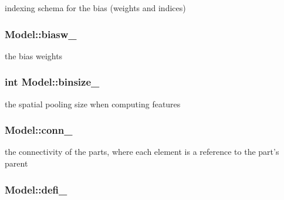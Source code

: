 indexing schema for the bias (weights and indices) 

\hypertarget{classModel_ab870c45d7637a43ba73c81cc4080a497}{
\subsubsection[{biasw\-\_\-}]{ Model\-::biasw\-\_\-\hspace{0.3cm}{\ttfamily [protected]}}}\label{classModel_ab870c45d7637a43ba73c81cc4080a497}


the bias weights 

\hypertarget{classModel_af34c4284d739cac02812d76eaa231679}{
\subsubsection[{binsize\-\_\-}]{\setlength{\rightskip}{0pt plus 5cm}int Model\-::binsize\-\_\-\hspace{0.3cm}{\ttfamily [protected]}}}\label{classModel_af34c4284d739cac02812d76eaa231679}


the spatial pooling size when computing features 

\hypertarget{classModel_a976b10b7048b41203eae19c141654abf}{
\subsubsection[{conn\-\_\-}]{ Model\-::conn\-\_\-\hspace{0.3cm}{\ttfamily [protected]}}}\label{classModel_a976b10b7048b41203eae19c141654abf}


the connectivity of the parts, where each element is a reference to the part's parent 

\hypertarget{classModel_a477df0e7641f38782085d0a425625d12}{
\subsubsection[{defi\-\_\-}]{ Model\-::defi\-\_\-\hspace{0.3cm}{\ttfamily [protected]}}}\label{classModel_a477df0e7641f38782085d0a425625d12}


